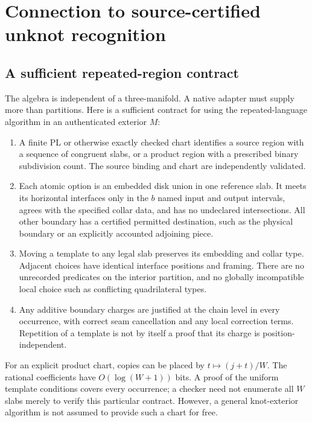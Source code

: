 \documentclass[11pt,a4paper]{article}
\theoremstyle{definition}
\begin{document}
\section{Connection to source-certified unknot recognition}\label{sec:geometry}

\subsection{A sufficient repeated-region contract}
The algebra is independent of a three-manifold. A native adapter must supply more than partitions. Here is a sufficient contract for using the repeated-language algorithm in an authenticated exterior $M$:
\begin{enumerate}[label=G\arabic*.]
\item A finite PL or otherwise exactly checked chart identifies a source region with a sequence of congruent slabs, or a product region with a prescribed binary subdivision count. The source binding and chart are independently validated.
\item Each atomic option is an embedded disk union in one reference slab. It meets its horizontal interfaces only in the $b$ named input and output intervals, agrees with the specified collar data, and has no undeclared intersections. All other boundary has a certified permitted destination, such as the physical boundary or an explicitly accounted adjoining piece.
\item Moving a template to any legal slab preserves its embedding and collar type. Adjacent choices have identical interface positions and framing. There are no unrecorded predicates on the interior partition, and no globally incompatible local choice such as conflicting quadrilateral types.
\item Any additive boundary charges are justified at the chain level in every occurrence, with correct seam cancellation and any local correction terms. Repetition of a template is not by itself a proof that its charge is position-independent.
\end{enumerate}
For an explicit product chart, copies can be placed by $t\mapsto(j+t)/W$. The rational coefficients have $O(\log(W+1))$ bits. A proof of the uniform template conditions covers every occurrence; a checker need not enumerate all $W$ slabs merely to verify this particular contract. However, a general knot-exterior algorithm is not assumed to provide such a chart for free.
\end{document}
